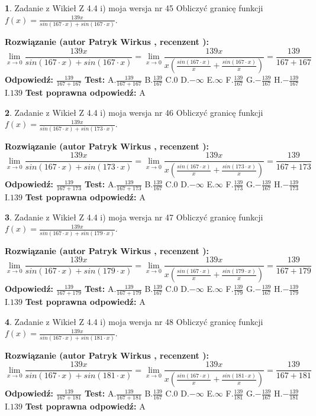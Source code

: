 \documentclass[12pt, a4paper]{article}
\theoremstyle{definition} %
\newtheorem{zad}{}
\newcommand{\zadStart}[1]{\begin{zad}#1\newline}
\newcommand{\zadStop}{\end{zad}}
\newcommand{\rozwStart}[2]{\noindent \textbf{Rozwiązanie (autor #1 , recenzent #2): }\newline}
\newcommand{\rozwStop}{\newline}
\newcommand{\odpStart}{\noindent \textbf{Odpowiedź:}\newline}
\newcommand{\odpStop}{\newline}
\newcommand{\testStart}{\noindent \textbf{Test:}\newline}
\newcommand{\testStop}{\newline}
\newcommand{\kluczStart}{\noindent \textbf{Test poprawna odpowiedź:}\newline}
\newcommand{\kluczStop}{\newline}
\begin{document}
\zadStart{Zadanie z Wikieł Z 4.4 i) moja wersja nr 45}
Obliczyć granicę funkcji $f(x)=\frac{139x}{sin(167\cdot x) +sin(167\cdot x)}$.
\zadStop
\rozwStart{Patryk Wirkus}{}
$$\lim\limits_{x\to 0}\frac{139x}{sin(167\cdot x) +sin(167\cdot x)}=\lim\limits_{x\to 0}\frac{139x}{x(\frac{sin(167\cdot x)}{x}+\frac{sin(167\cdot x)}{x})}=\frac{139}{167+167}$$
\rozwStop
\odpStart
$\frac{139}{167+167}$
\odpStop
\testStart
A.$\frac{139}{167+167}$
B.$\frac{139}{167}$
C.$0$
D.$-\infty$
E.$\infty$
F.$\frac{139}{167}$
G.$-\frac{139}{167}$
H.$-\frac{139}{167}$
I.$139$
\testStop
\kluczStart
A
\kluczStop



\zadStart{Zadanie z Wikieł Z 4.4 i) moja wersja nr 46}
Obliczyć granicę funkcji $f(x)=\frac{139x}{sin(167\cdot x) +sin(173\cdot x)}$.
\zadStop
\rozwStart{Patryk Wirkus}{}
$$\lim\limits_{x\to 0}\frac{139x}{sin(167\cdot x) +sin(173\cdot x)}=\lim\limits_{x\to 0}\frac{139x}{x(\frac{sin(167\cdot x)}{x}+\frac{sin(173\cdot x)}{x})}=\frac{139}{167+173}$$
\rozwStop
\odpStart
$\frac{139}{167+173}$
\odpStop
\testStart
A.$\frac{139}{167+173}$
B.$\frac{139}{167}$
C.$0$
D.$-\infty$
E.$\infty$
F.$\frac{139}{173}$
G.$-\frac{139}{167}$
H.$-\frac{139}{173}$
I.$139$
\testStop
\kluczStart
A
\kluczStop



\zadStart{Zadanie z Wikieł Z 4.4 i) moja wersja nr 47}
Obliczyć granicę funkcji $f(x)=\frac{139x}{sin(167\cdot x) +sin(179\cdot x)}$.
\zadStop
\rozwStart{Patryk Wirkus}{}
$$\lim\limits_{x\to 0}\frac{139x}{sin(167\cdot x) +sin(179\cdot x)}=\lim\limits_{x\to 0}\frac{139x}{x(\frac{sin(167\cdot x)}{x}+\frac{sin(179\cdot x)}{x})}=\frac{139}{167+179}$$
\rozwStop
\odpStart
$\frac{139}{167+179}$
\odpStop
\testStart
A.$\frac{139}{167+179}$
B.$\frac{139}{167}$
C.$0$
D.$-\infty$
E.$\infty$
F.$\frac{139}{179}$
G.$-\frac{139}{167}$
H.$-\frac{139}{179}$
I.$139$
\testStop
\kluczStart
A
\kluczStop



\zadStart{Zadanie z Wikieł Z 4.4 i) moja wersja nr 48}
Obliczyć granicę funkcji $f(x)=\frac{139x}{sin(167\cdot x) +sin(181\cdot x)}$.
\zadStop
\rozwStart{Patryk Wirkus}{}
$$\lim\limits_{x\to 0}\frac{139x}{sin(167\cdot x) +sin(181\cdot x)}=\lim\limits_{x\to 0}\frac{139x}{x(\frac{sin(167\cdot x)}{x}+\frac{sin(181\cdot x)}{x})}=\frac{139}{167+181}$$
\rozwStop
\odpStart
$\frac{139}{167+181}$
\odpStop
\testStart
A.$\frac{139}{167+181}$
B.$\frac{139}{167}$
C.$0$
D.$-\infty$
E.$\infty$
F.$\frac{139}{181}$
G.$-\frac{139}{167}$
H.$-\frac{139}{181}$
I.$139$
\testStop
\kluczStart
A
\kluczStop
\end{document}
